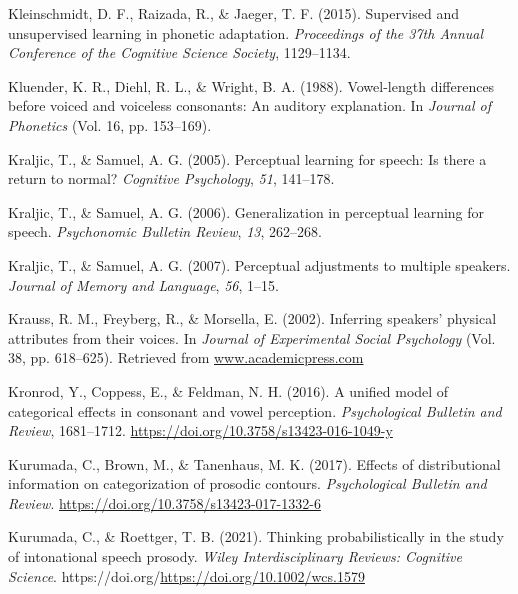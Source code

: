 \documentclass[
  11pt,
  man,floatsintext]{apa6}
\newlength{\cslhangindent}
\newlength{\cslentryspacingunit} %
\newenvironment{CSLReferences}[2] %
 {%
  \setlength{\parindent}{0pt}
  \ifodd #1
  \let\oldpar\par
  \def\par{\hangindent=\cslhangindent\oldpar}
  \fi
  \setlength{\parskip}{#2\cslentryspacingunit}
 }%
 {}
\begin{document}
\begin{CSLReferences}{1}{0}
\leavevmode{}%
Kleinschmidt, D. F., Raizada, R., \& Jaeger, T. F. (2015). Supervised and unsupervised learning in phonetic adaptation. \emph{Proceedings of the 37th Annual Conference of the Cognitive Science Society}, 1129--1134.

\leavevmode{}%
Kluender, K. R., Diehl, R. L., \& Wright, B. A. (1988). Vowel-length differences before voiced and voiceless consonants: An auditory explanation. In \emph{Journal of Phonetics} (Vol. 16, pp. 153--169).

\leavevmode{}%
Kraljic, T., \& Samuel, A. G. (2005). Perceptual learning for speech: Is there a return to normal? \emph{Cognitive Psychology}, \emph{51}, 141--178.

\leavevmode{}%
Kraljic, T., \& Samuel, A. G. (2006). Generalization in perceptual learning for speech. \emph{Psychonomic Bulletin Review}, \emph{13}, 262--268.

\leavevmode{}%
Kraljic, T., \& Samuel, A. G. (2007). Perceptual adjustments to multiple speakers. \emph{Journal of Memory and Language}, \emph{56}, 1--15.

\leavevmode{}%
Krauss, R. M., Freyberg, R., \& Morsella, E. (2002). Inferring speakers' physical attributes from their voices. In \emph{Journal of Experimental Social Psychology} (Vol. 38, pp. 618--625). Retrieved from \href{https://www.academicpress.com}{www.academicpress.com}

\leavevmode{}%
Kronrod, Y., Coppess, E., \& Feldman, N. H. (2016). A unified model of categorical effects in consonant and vowel perception. \emph{Psychological Bulletin and Review}, 1681--1712. \url{https://doi.org/10.3758/s13423-016-1049-y}

\leavevmode{}%
Kurumada, C., Brown, M., \& Tanenhaus, M. K. (2017). Effects of distributional information on categorization of prosodic contours. \emph{Psychological Bulletin and Review}. \url{https://doi.org/10.3758/s13423-017-1332-6}

\leavevmode{}%
Kurumada, C., \& Roettger, T. B. (2021). Thinking probabilistically in the study of intonational speech prosody. \emph{Wiley Interdisciplinary Reviews: Cognitive Science}. https://doi.org/\url{https://doi.org/10.1002/wcs.1579}


\end{CSLReferences}
\end{document}
